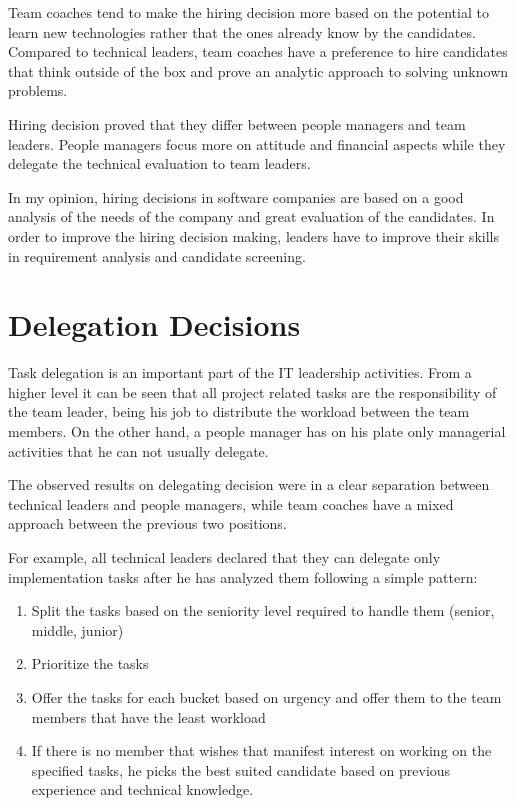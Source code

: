 Team coaches tend to make the hiring decision more based on the potential to learn new technologies rather that the ones already know by the candidates. Compared to technical leaders, team coaches have a preference to hire candidates that think outside of the box and prove an analytic approach to solving unknown problems.

Hiring decision proved that they differ between people managers and team leaders. People managers focus more on attitude and financial aspects while they delegate the technical evaluation to team leaders. 

In my opinion, hiring decisions in software companies are based on a good analysis of the needs of the company and great evaluation of the candidates. In order to improve the hiring decision making, leaders have to improve their skills in requirement analysis and candidate screening.

\section{Delegation Decisions}
\label{sec:delegation}
Task delegation is an important part of the IT leadership activities. From a higher level it can be seen that all project related tasks are the responsibility of the team leader, being his job to distribute the workload between the team members. On the other hand, a people manager has on his plate only managerial activities that he can not usually delegate.

The observed results on delegating decision were in a clear separation between technical leaders and people managers, while team coaches have a mixed approach between the previous two positions.

For example, all technical leaders declared that they can delegate only implementation tasks after he has analyzed them following a simple pattern:
\begin{enumerate}
\item Split the tasks based on the seniority level required to handle them (senior, middle, junior)
\item Prioritize the tasks
\item Offer the tasks for each bucket based on urgency and offer them to the team members that have the least workload
\item If there is no member that wishes that manifest interest on working on the specified tasks, he picks the best suited candidate based on previous experience and technical knowledge.
\end{enumerate}

